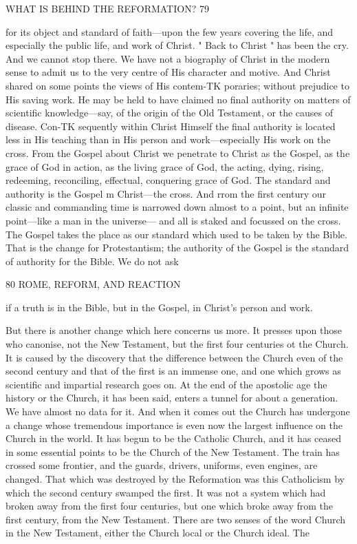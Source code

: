 \documentclass[12pt,a5paper,twoside]{book}
\begin{document}
WHAT IS BEHIND THE REFORMATION? 79 

for its object and standard of faith---upon the few years 
covering the life, and especially the public life, and 
work of Christ. " Back to Christ " has been the cry. 
And we cannot stop there. We have not a biography 
of Christ in the modern sense to admit us to the 
very centre of His character and motive. And Christ 
shared on some points the views of His contem-TK
poraries; without prejudice to His saving work. He 
may be held to have claimed no final authority on 
matters of scientific knowledge---say, of the origin of 
the Old Testament, or the causes of disease. Con-TK
sequently within Christ Himself the final authority 
is located less in His teaching than in His person and 
work---especially His work on the cross. From the 
Gospel about Christ we penetrate to Christ as the 
Gospel, as the grace of God in action, as the living 
grace of God, the acting, dying, rising, redeeming, 
reconciling, effectual, conquering grace of God. The 
standard and authority is the Gospel m Christ---the 
cross. And rrom the first century our classic and 
commanding time is narrowed down almost to a point, 
but an infinite point---like a man in the universe---
and all is staked and focussed on the cross. The 
Gospel takes the place as our standard which used 
to be taken by the Bible. That is the change for 
Protestantism; the authority of the Gospel is the 
standard of authority for the Bible. We do not ask 



80 ROME, REFORM, AND REACTION 

if a truth is in the Bible, but in the Gospel, in 
Christ's person and work. 

But there is another change which here concerns 
us more. It presses upon those who canonise, not the 
New Testament, but the first four centuries ot the 
Church. It is caused by the discovery that the 
difference between the Church even of the second 
century and that of the first is an immense one, and 
one which grows as scientific and impartial research 
goes on. At the end of the apostolic age the history or 
the Church, it has been said, enters a tunnel for about 
a generation. We have almost no data for it. And 
when it comes out the Church has undergone a 
change whose tremendous importance is even now 
the largest influence on the Church in the world. It 
has begun to be the Catholic Church, and it has 
ceased in some essential points to be the Church of 
the New Testament. The train has crossed some 
frontier, and the guards, drivers, uniforms, even 
engines, are changed. That which was destroyed by 
the Reformation was this Catholicism by which the 
second century swamped the first. It was not a 
system which had broken away from the first four 
centuries, but one which broke away from the first 
century, from the New Testament. There are two 
senses of the word Church in the New Testament, 
either the Church local or the Church ideal. The 
\end{document}
